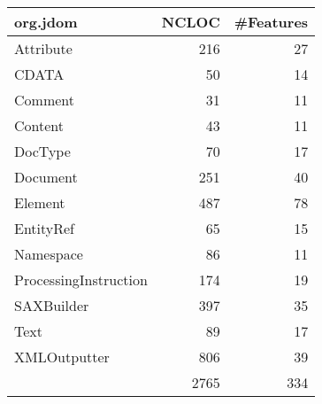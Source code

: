 \begin{tabular}{|l|r|r|}\hline
org.jdom & NCLOC & \#Features\\\hline\hline
Attribute & 216 & 27\\\hline
CDATA & 50 & 14\\\hline
Comment & 31 & 11\\\hline
Content & 43 & 11\\\hline
DocType & 70 & 17\\\hline
Document & 251 & 40\\\hline
Element & 487 & 78\\\hline
EntityRef & 65 & 15\\\hline
Namespace & 86 & 11\\\hline
ProcessingInstruction & 174 & 19\\\hline
SAXBuilder & 397 & 35\\\hline
Text & 89 & 17\\\hline
XMLOutputter & 806 & 39\\\hline
\hline
 & 2765 & 334\\\hline
\end{tabular}
